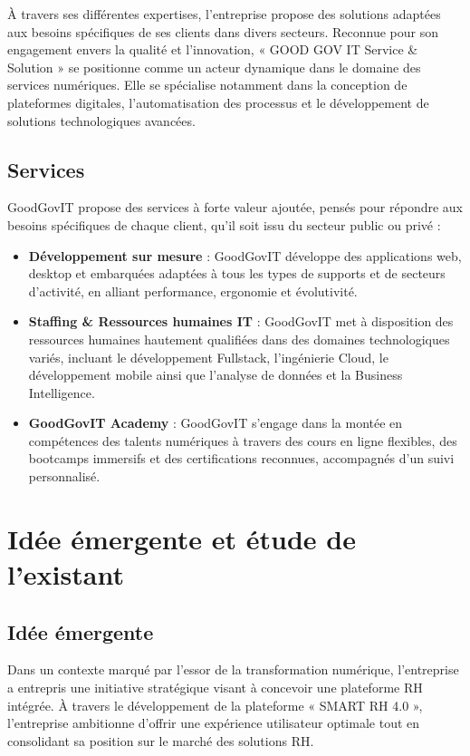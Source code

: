 À travers ses différentes expertises, l'entreprise propose des solutions adaptées aux besoins spécifiques de ses clients dans divers secteurs. Reconnue pour son engagement envers la qualité et l'innovation, « GOOD GOV IT Service \& Solution » se positionne comme un acteur dynamique dans le domaine des services numériques. Elle se spécialise notamment dans la conception de plateformes digitales, l'automatisation des processus et le développement de solutions technologiques avancées.

\subsection{Services}

GoodGovIT propose des services à forte valeur ajoutée, pensés pour répondre aux besoins spécifiques de chaque client, qu'il soit issu du secteur public ou privé :

\begin{itemize}
    \item \textbf{Développement sur mesure} : GoodGovIT développe des applications web, desktop et embarquées adaptées à tous les types de supports et de secteurs d'activité, en alliant performance, ergonomie et évolutivité.
    
    \item \textbf{Staffing \& Ressources humaines IT} : GoodGovIT met à disposition des ressources humaines hautement qualifiées dans des domaines technologiques variés, incluant le développement Fullstack, l'ingénierie Cloud, le développement mobile ainsi que l'analyse de données et la Business Intelligence.
    
    \item \textbf{GoodGovIT Academy} : GoodGovIT s'engage dans la montée en compétences des talents numériques à travers des cours en ligne flexibles, des bootcamps immersifs et des certifications reconnues, accompagnés d'un suivi personnalisé.
\end{itemize}

\section{Idée émergente et étude de l'existant}

\subsection{Idée émergente}

Dans un contexte marqué par l'essor de la transformation numérique, l'entreprise a entrepris une initiative stratégique visant à concevoir une plateforme RH intégrée. À travers le développement de la plateforme « SMART RH 4.0 », l'entreprise ambitionne d'offrir une expérience utilisateur optimale tout en consolidant sa position sur le marché des solutions RH.

